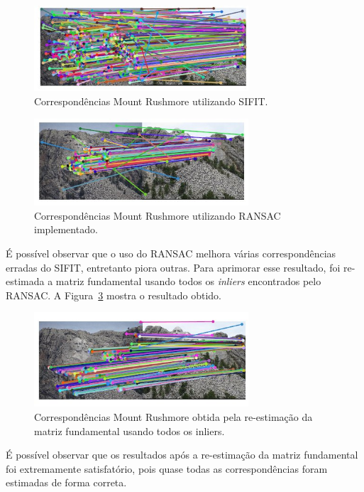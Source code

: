 \begin{figure}[h]
    \centering
    \includegraphics[width=8cm]{sift.jpg}
    \caption{Correspondências Mount Rushmore utilizando SIFIT.}
    \label{fig:sift}
\end{figure}

\begin{figure}[h]
    \centering
    \includegraphics[width=8cm]{ransac1.jpg}
    \caption{Correspondências Mount Rushmore utilizando RANSAC implementado.}
    \label{fig:rasac1}
\end{figure}


É possível observar que o uso do RANSAC melhora várias correspondências erradas do SIFIT, entretanto piora outras. Para aprimorar esse resultado, foi re-estimada a matriz fundamental usando todos os \textit{inliers} encontrados pelo RANSAC. A Figura~\ref{fig:rasac2} mostra o resultado obtido.

\begin{figure}[h]
    \centering
    \includegraphics[width=8cm]{ransac2.jpg}
    \caption{Correspondências Mount Rushmore obtida pela re-estimação da matriz fundamental usando todos os inliers.}
    \label{fig:rasac2}
\end{figure}

É possível observar que os resultados após a re-estimação da matriz fundamental foi extremamente satisfatório, pois quase todas as correspondências foram estimadas de forma correta.








